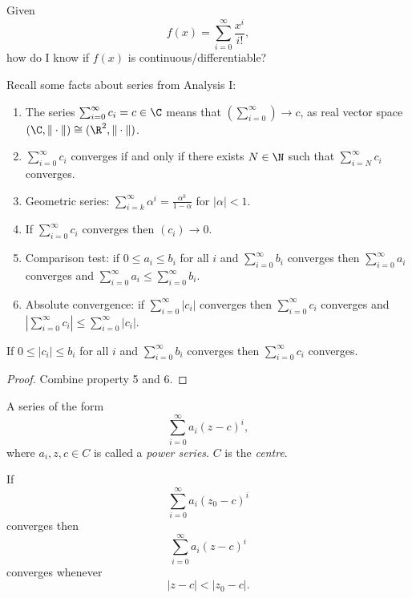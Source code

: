 \documentclass[a4paper]{article}
\theoremstyle{definition}
\begin{document}
\begin{question}
  Given
  \[
    f(x) = \sum_{i=0}^{\infty} \frac{x^i}{i!},
  \]
  how do I know if \(f(x)\) is continuous/differentiable?
\end{question}

Recall some facts about series from Analysis I:
\begin{enumerate}
\item The series \(\sum_{i=0}^{\infty}c_i = c\in\C \) means that \((\sum_{i=0}^{\infty})\to c\), as real vector space \((\C, \|\cdot\|) \cong (\R^2, \|\cdot\|)\).
\item \(\sum_{i=0}^{\infty}c_i \) converges if and only if there exists \(N\in\N\) such that \(\sum_{i=N}^{\infty}c_i \) converges.
\item Geometric series: \(\sum_{i=k}^{\infty}\alpha^i = \frac{\alpha^k}{1-\alpha} \) for \(|\alpha|<1\).
\item If \(\sum_{i=0}^{\infty}c_i \) converges then \((c_i)\to 0\).
\item Comparison test: if \(0 \leq a_i \leq b_i\) for all \(i\) and \(\sum_{i=0}^{\infty}b_i \) converges then \(\sum_{i=0}^{\infty}a_i \) converges and \(\sum_{i=0}^{\infty}a_i \leq \sum_{i=0}^{\infty}b_i \).
\item Absolute convergence: if \(\sum_{i=0}^{\infty}|c_i| \) converges then \(\sum_{i=0}^{\infty}c_i \) converges and \(|\sum_{i=0}^{\infty}c_i| \leq \sum_{i=0}^{\infty}|c_i| \).
\end{enumerate}

\begin{lem}
  If \(0 \leq |c_i| \leq b_i \) for all \(i\) and \(\sum_{i=0}^{\infty}b_i \) converges then \(\sum_{i=0}^{\infty}c_i \) converges.
\end{lem}

\begin{proof}
  Combine property 5 and 6.
\end{proof}

\begin{defi}
A series of the form
\[
\sum_{i=0}^{\infty}a_i(z-c)^i,
\]
where \(a_i,z,c\in C\) is called a \emph{power series}. \(C\) is the \emph{centre}.
\end{defi}

\begin{prop}
  \label{prop:pointwise convergence of series}
  If
  \[
    \sum_{i=0}^{\infty}a_i(z_0-c)^i
  \]
  converges then
  \[
    \sum_{i=0}^{\infty}a_i(z-c)^i
  \]
  converges whenever
  \[
|z-c| < |z_0-c|.
  \]
\end{prop}
\end{document}
